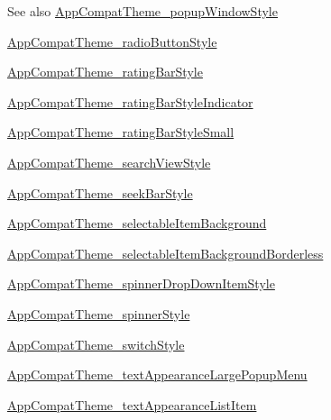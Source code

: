 \begin{DoxySeeAlso}{See also}
\hyperlink{classandroid_1_1support_1_1v7_1_1appcompat_1_1R_1_1styleable_ab49e956338c41cad14a71489cf3e3ad1}{App\+Compat\+Theme\+\_\+popup\+Window\+Style} 

\hyperlink{classandroid_1_1support_1_1v7_1_1appcompat_1_1R_1_1styleable_a32deb732b0bc3a329b727aef8b0c20d7}{App\+Compat\+Theme\+\_\+radio\+Button\+Style} 

\hyperlink{classandroid_1_1support_1_1v7_1_1appcompat_1_1R_1_1styleable_a3252c016d788ccf2df296402f41db160}{App\+Compat\+Theme\+\_\+rating\+Bar\+Style} 

\hyperlink{classandroid_1_1support_1_1v7_1_1appcompat_1_1R_1_1styleable_a41bbe74341c8a14fa0aee8d6ae300f08}{App\+Compat\+Theme\+\_\+rating\+Bar\+Style\+Indicator} 

\hyperlink{classandroid_1_1support_1_1v7_1_1appcompat_1_1R_1_1styleable_a3d5d0c2c3772e2f0c3548e65cffca34f}{App\+Compat\+Theme\+\_\+rating\+Bar\+Style\+Small} 

\hyperlink{classandroid_1_1support_1_1v7_1_1appcompat_1_1R_1_1styleable_a0dd40ca8d5fe4531e45a7f4d0c4cc276}{App\+Compat\+Theme\+\_\+search\+View\+Style} 

\hyperlink{classandroid_1_1support_1_1v7_1_1appcompat_1_1R_1_1styleable_a082b50a47359f28a983cbc03e6d51289}{App\+Compat\+Theme\+\_\+seek\+Bar\+Style} 

\hyperlink{classandroid_1_1support_1_1v7_1_1appcompat_1_1R_1_1styleable_ad19a8df967ad91c672478f779be959c7}{App\+Compat\+Theme\+\_\+selectable\+Item\+Background} 

\hyperlink{classandroid_1_1support_1_1v7_1_1appcompat_1_1R_1_1styleable_a6b4e748fcf3ab58f9a756773bb3bf432}{App\+Compat\+Theme\+\_\+selectable\+Item\+Background\+Borderless} 

\hyperlink{classandroid_1_1support_1_1v7_1_1appcompat_1_1R_1_1styleable_abcc5a46cb6b46deb459f96b4b614a633}{App\+Compat\+Theme\+\_\+spinner\+Drop\+Down\+Item\+Style} 

\hyperlink{classandroid_1_1support_1_1v7_1_1appcompat_1_1R_1_1styleable_a479f2661585bab71f0ceb0c86482f40d}{App\+Compat\+Theme\+\_\+spinner\+Style} 

\hyperlink{classandroid_1_1support_1_1v7_1_1appcompat_1_1R_1_1styleable_a57e1f510b55a34ce46089f5c131a9d99}{App\+Compat\+Theme\+\_\+switch\+Style} 

\hyperlink{classandroid_1_1support_1_1v7_1_1appcompat_1_1R_1_1styleable_a8ecc7b52c9caba35359833cfc27874d8}{App\+Compat\+Theme\+\_\+text\+Appearance\+Large\+Popup\+Menu} 

\hyperlink{classandroid_1_1support_1_1v7_1_1appcompat_1_1R_1_1styleable_a59547599ad3f87d998f6508204f27aa1}{App\+Compat\+Theme\+\_\+text\+Appearance\+List\+Item} 


\end{DoxySeeAlso}
